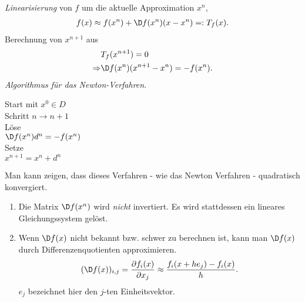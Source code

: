 \textit{Linearisierung} von $f$ um die aktuelle Approximation $x^n$,
\begin{align*}
f(x)\approx f(x^n) + \D f(x^n)(x-x^n) =: T_f(x).
\end{align*}
Berechnung von $x^{n+1}$ aus
\begin{align*}
&T_f(x^{n+1}) = 0\\
\Rightarrow &
\D f(x^n) (x^{n+1}-x^n) = -f(x^n).
\end{align*}
\textit{Algorithmus für das Newton-Verfahren}.
\begin{tabbing}
\hspace{20pt}	Start mit $x^0\in D$\\
\hspace{20pt}	Schritt $n\to n+1$\\
\hspace{40pt}		Löse \\
\hspace{60pt}			$\D f(x^n)d^n = -f(x^n)$\\
\hspace{40pt}		Setze\\
\hspace{60pt}			$x^{n+1}=x^n+d^n$
\end{tabbing}
Man kann zeigen, dass dieses Verfahren - wie das Newton Verfahren - quadratisch
konvergiert.
\begin{bemn}[Bemerkungen.]
\begin{enumerate}[label=(\roman{*})]
  \item Die Matrix $\D f(x^n)$ wird \textit{nicht} invertiert. Es wird
  stattdessen ein lineares Gleichungssystem gelöst.
  \item Wenn $\D f(x)$ nicht bekannt bzw. schwer zu berechnen ist, kann man $\D
  f(x)$ durch Differenzenquotienten approximieren.
  \begin{align*}
  (\D f(x))_{i,j} = \frac{\partial f_i(x)}{\partial x_j} \approx
  \frac{f_i(x+h e_j)-f_i(x)}{h}. 
  \end{align*}
$e_j$ bezeichnet hier den $j$-ten Einheitsvektor.\maphere
\end{enumerate}
\end{bemn}

